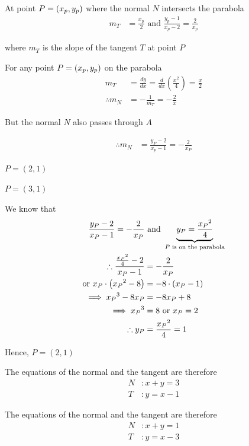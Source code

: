 \documentclass[14pt,fleqn]{extarticle}
\begin{document}
\newcard 

At point $P = \left(x_p,y_p \right)$ where the normal $N$ intersects the parabola 
\begin{align}
m_T &= \frac{x_p}{2}\text{ and } \frac{y_p-1}{x_p-2} = \frac{2}{x_p} 
\end{align}

where $m_T$ is the slope of the tangent $T$ at point $P$ 

\newcard 

For any point $P=\left(x_p,y_p \right)$ on the parabola 
\begin{align}
m_T &= \frac{dy}{dx} = \frac{d}{dx}\left( \frac{x^2}{4}\right) = \frac{x}{2} \\
\therefore m_N &= -\frac{1}{m_T} = -\frac{2}{x}
\end{align}

But the normal $N$ also passes through $A$

\begin{align}
\therefore m_N &= \frac{y_P - 2}{x_p - 1} = -\frac{2}{x_P}
\end{align}

\newcard 
$P = \left( 2,1\right)$ 

\newcard 

$P = \left(3,1 \right)$

\newcard 
We know that 
\begin{align}
	\frac{y_P - 2}{x_P - 1} = -\frac{2}{x_P} &\text{ and } \underbrace{y_P = \frac{{x_P}^2}{4}}_{\text{$P$ is on the parabola}} \\
	\therefore \frac{\frac{{x_P}^2}{4} - 2}{x_P - 1} &= -\frac{2}{x_P} \\
	\text{or } x_P\cdot \left({x_P}^2 - 8 \right) &= -8\cdot \left(x_P-1 \right) \\
	\implies {x_P}^3 - 8x_P &= -8x_P + 8 \\
	\implies {x_P}^3 &= 8\text{ or }x_P = 2  \\
	\therefore y_P &= \frac{{x_P}^2}{4} =  1 
\end{align}

Hence, $P = (2,1)$ 

\newcard 

The equations of the normal and the tangent are therefore 
\begin{align}
	N&: x+y = 3 \\
	T&: y = x - 1 
\end{align}

\newcard 

The equations of the normal and the tangent are therefore 
\begin{align}
	N&: x+y = 1 \\
	T&: y = x - 3 
\end{align}
\end{document}
